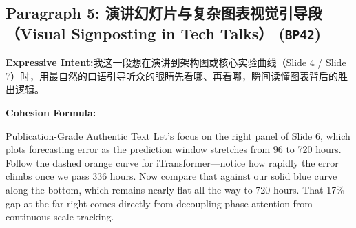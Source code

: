 \subsection*{Paragraph 5: 演讲幻灯片与复杂图表视觉引导段（Visual Signposting in Tech Talks） (\texttt{BP42})}
\noindent\textbf{Expressive Intent:}\enspace 我这一段想在演讲到架构图或核心实验曲线（Slide 4 / Slide 7）时，用最自然的口语引导听众的眼睛先看哪、再看哪，瞬间读懂图表背后的胜出逻辑。\par
\noindent\textbf{Cohesion Formula:}\par\vspace{4pt}
\begin{ExampleBox}{Publication-Grade Authentic Text}
Let's focus on the right panel of Slide 6, which plots forecasting error as the prediction window stretches from 96 to 720 hours. Follow the dashed orange curve for iTransformer---notice how rapidly the error climbs once we pass 336 hours. Now compare that against our solid blue curve along the bottom, which remains nearly flat all the way to 720 hours. That 17\% gap at the far right comes directly from decoupling phase attention from continuous scale tracking.
\end{ExampleBox}
